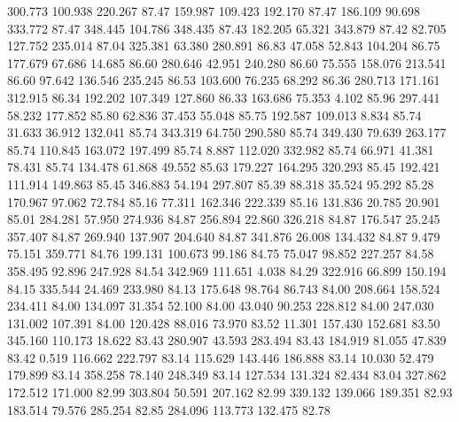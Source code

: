  300.773  100.938  220.267        87.47
 159.987  109.423  192.170        87.47
 186.109   90.698  333.772        87.47
 348.445  104.786  348.435        87.43
 182.205   65.321  343.879        87.42
  82.705  127.752  235.014        87.04
 325.381   63.380  280.891        86.83
  47.058   52.843  104.204        86.75
 177.679   67.686   14.685        86.60
 280.646   42.951  240.280        86.60
  75.555  158.076  213.541        86.60
  97.642  136.546  235.245        86.53
 103.600   76.235   68.292        86.36
 280.713  171.161  312.915        86.34
 192.202  107.349  127.860        86.33
 163.686   75.353    4.102        85.96
 297.441   58.232  177.852        85.80
  62.836   37.453   55.048        85.75
 192.587  109.013    8.834        85.74
  31.633   36.912  132.041        85.74
 343.319   64.750  290.580        85.74
 349.430   79.639  263.177        85.74
 110.845  163.072  197.499        85.74
   8.887  112.020  332.982        85.74
  66.971   41.381   78.431        85.74
 134.478   61.868   49.552        85.63
 179.227  164.295  320.293        85.45
 192.421  111.914  149.863        85.45
 346.883   54.194  297.807        85.39
  88.318   35.524   95.292        85.28
 170.967   97.062   72.784        85.16
  77.311  162.346  222.339        85.16
 131.836   20.785   20.901        85.01
 284.281   57.950  274.936        84.87
 256.894   22.860  326.218        84.87
 176.547   25.245  357.407        84.87
 269.940  137.907  204.640        84.87
 341.876   26.008  134.432        84.87
   9.479   75.151  359.771        84.76
 199.131  100.673   99.186        84.75
  75.047   98.852  227.257        84.58
 358.495   92.896  247.928        84.54
 342.969  111.651    4.038        84.29
 322.916   66.899  150.194        84.15
 335.544   24.469  233.980        84.13
 175.648   98.764   86.743        84.00
 208.664  158.524  234.411        84.00
 134.097   31.354   52.100        84.00
  43.040   90.253  228.812        84.00
 247.030  131.002  107.391        84.00
 120.428   88.016   73.970        83.52
  11.301  157.430  152.681        83.50
 345.160  110.173   18.622        83.43
 280.907   43.593  283.494        83.43
 184.919   81.055   47.839        83.42
   0.519  116.662  222.797        83.14
 115.629  143.446  186.888        83.14
  10.030   52.479  179.899        83.14
 358.258   78.140  248.349        83.14
 127.534  131.324   82.434        83.04
 327.862  172.512  171.000        82.99
 303.804   50.591  207.162        82.99
 339.132  139.066  189.351        82.93
 183.514   79.576  285.254        82.85
 284.096  113.773  132.475        82.78
